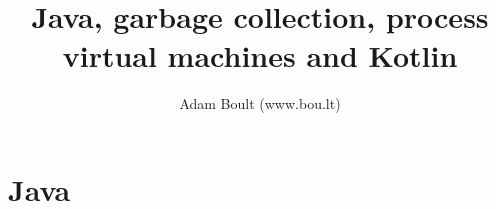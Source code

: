 \documentclass[oneside]{book}
\begin{document}
\author{Adam Boult (www.bou.lt)}
\title{Java, garbage collection, process virtual machines and Kotlin}
\maketitle

\setcounter{tocdepth}{0}
\tableofcontents



\part{Java}

\end{document}
